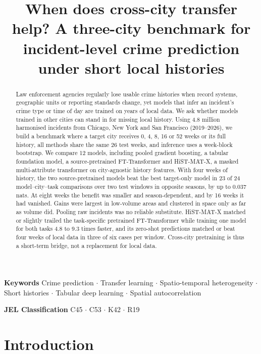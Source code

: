 \documentclass[11pt]{article}
\title{When does cross-city transfer help? A three-city benchmark for incident-level crime prediction under short local histories}
\date{}
\newcommand{\HMX}{HiST-MAT-X}
\begin{document}
\maketitle
\vspace{-3em}

\begin{abstract}
\noindent Law enforcement agencies regularly lose usable crime histories when record systems, geographic units or reporting standards change, yet models that infer an incident's crime type or time of day are trained on years of local data. We ask whether models trained in other cities can stand in for missing local history. Using 4.8 million harmonised incidents from Chicago, New York and San Francisco (2019--2026), we build a benchmark where a target city receives 0, 4, 8, 16 or 52 weeks or its full history, all methods share the same 26 test weeks, and inference uses a week-block bootstrap. We compare 12 models, including pooled gradient boosting, a tabular foundation model, a source-pretrained FT-Transformer and \HMX{}, a masked multi-attribute transformer on city-agnostic history features. With four weeks of history, the two source-pretrained models beat the best target-only model in 23 of 24 model--city--task comparisons over two test windows in opposite seasons, by up to 0.037 nats. At eight weeks the benefit was smaller and season-dependent, and by 16 weeks it had vanished. Gains were largest in low-volume areas and clustered in space only as far as volume did. Pooling raw incidents was no reliable substitute. \HMX{} matched or slightly trailed the task-specific pretrained FT-Transformer while training one model for both tasks 4.8 to 9.3 times faster, and its zero-shot predictions matched or beat four weeks of local data in three of six cases per window. Cross-city pretraining is thus a short-term bridge, not a replacement for local data.
\end{abstract}

\noindent\textbf{Keywords} Crime prediction $\cdot$ Transfer learning $\cdot$ Spatio-temporal heterogeneity $\cdot$ Short histories $\cdot$ Tabular deep learning $\cdot$ Spatial autocorrelation

\noindent\textbf{JEL Classification} C45 $\cdot$ C53 $\cdot$ K42 $\cdot$ R19

\section{Introduction}\label{sec:intro}
\end{document}
